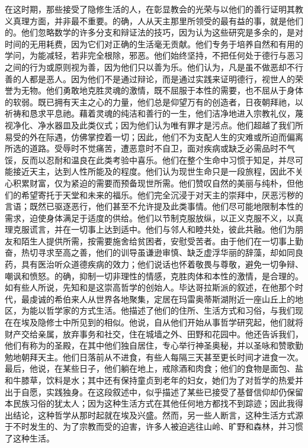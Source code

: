 在这时期，那些接受了隐修生活的人，在彰显教会的光荣与以他们的善行证明其教义真理方面，并非最不重要。的确，人从天主那里所领受的最有益的事，就是他们的。他们忽略数学的许多分支和辩证法的技巧，因为认为这些研究是多余的，是对时间的无用耗费，因为它们对正确的生活毫无贡献。他们专务于培养自然和有用的学问，为能减轻，若非完全根除，邪恶。他们始终坚持，不把任何处于德行与恶习之间的行为或原则视为善，因为他们只以善为乐。他们认为，凡是虽不做恶却不行善的人都是恶人。因为他们不是通过辩论，而是通过实践来证明德行，视世人的荣誉为无物。他们勇敢地克胜灵魂的激情，既不屈服于本性的需要，也不屈从于身体的软弱。既已拥有天主之心的力量，他们总是仰望万有的创造者，日夜朝拜祂，以祈祷和恳求平息祂。藉着灵魂的纯洁和善行的一生，他们洁净地进入宗教礼仪，蔑视净化、净水器皿及此类仪式；因为他们认为唯有罪才是污点。他们超越了我们所易受的外在际遇，仿佛掌控着一切；因此，他们不为支配人生的灾难或所迫而偏离所选的道路。受辱时不觉痛苦，遭恶意时不自卫，面对疾病或缺乏必需品时不气馁，反而以忍耐和温良在此类考验中喜乐。他们在整个生命中习惯于知足，并尽可能接近天主，达到人性所能及的程度。他们认为现世生命只是一段旅程，因此不关心积累财富，仅为紧迫的需要而预备现世所需。他们赞叹自然的美丽与纯朴，但他们的希望寄托于天堂和未来的福乐。他们完全沉浸于对天主的崇拜中，厌恶污秽的言语；既然已驱逐恶行，他们甚至不允许提及此类事情。他们尽可能地限制本性的需求，迫使身体满足于适度的供给。他们以节制克服放纵，以正义克服不义，以真理克服谎言，并在一切事上达到适中。他们与邻人和睦共处，彼此共融。他们为朋友和陌生人提供所需，按需要施舍给贫困者，安慰受苦者。由于他们在一切事上勤奋，热切寻求至高之善，他们的训导虽谦逊审慎、缺乏虚浮华丽的辞藻，却如同良药，具有医治听众道德疾病的效力；他们说话也怀着敬畏与尊敬，避免一切争辩、嘲讽和愤怒。的确，抑制一切非理性的情感，克胜肉体和本性的激情，是合理的。如有些人所说，先知和是这崇高哲学的创始人。毕达哥拉斯派的叙述，在他那个时代，最虔诚的希伯来人从世界各地聚集，定居在玛雷奥蒂斯湖附近一座山丘上的地区，为能以哲学家的方式生活。他描述了他们的住所、生活方式和习俗，与我们现在在埃及隐修士中所见到的相似。他说，自从他们开始从事哲学研究起，他们就将财产交给亲属，放弃事务和社交，住在城墙之外、田野和花园中。他还告诉我们，他们有称为的圣殿，在其中他们独自居住，专心举行神圣奥秘，并以圣咏和赞歌勤勉地朝拜天主。他们日落前从不进食，有些人每隔三天甚至更长时间才进食一次。最后，他说，在某些日子，他们躺在地上，戒除酒和肉食；他们的食物是面包、盐和牛膝草，饮料是水；其中还有保持童贞到老年的妇女，她们为了对哲学的热爱并出于自愿，实践独身。在这段叙述中，似乎描述了某些已接受了基督信仰却仍保留本民族习俗的犹太人；因为这种生活方式在其他任何地方都找不到踪迹；因此我得出结论，这种哲学从那时起就在埃及兴盛。然而，另一些人断言，这种生活方式源于不时发生的、为了宗教而受的迫害，许多人被迫逃往山岭、旷野和森林，并习惯了这种生活。\par

